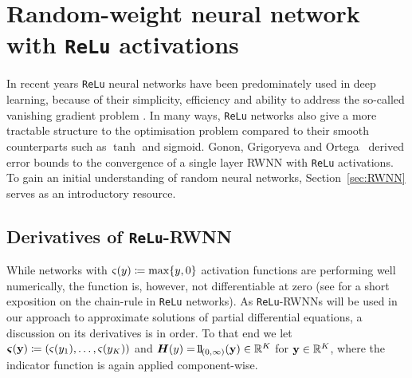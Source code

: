 \section{Random-weight neural network with \texttt{ReLu} activations}\label{sec:ReLu-RWNN}

In recent years \texttt{ReLu} neural networks have been predominately used in deep learning, because of their simplicity, efficiency and ability to address the so-called vanishing gradient problem \cite{LeCun2012EfficientBackProp}. In many ways, \texttt{ReLu} networks also give a more tractable structure to the optimisation problem compared to their smooth counterparts such as $\tanh$ and sigmoid. 
Gonon, Grigoryeva and Ortega~\cite{Gonon2023ApproximationSystems} derived error bounds to the convergence of a single layer RWNN with \texttt{ReLu} activations. 
To gain an initial understanding of random neural networks, Section~\ref{sec:RWNN} serves as an introductory resource.

\subsection{Derivatives of \texttt{ReLu}-RWNN}
\label{sec:RWNNderivatives}
While networks with ${\varsigma(y)\coloneqq \max\{y,0\}}$ activation functions are performing well numerically, the function is, however, not differentiable at zero (see \cite{Berner2019TowardsEstimates} for a short exposition on the chain-rule in \texttt{ReLu} networks). As \texttt{ReLu}-RWNNs will be used in our approach to approximate solutions of partial differential equations, a discussion on its derivatives is in order. 
To that end we let $\operatorname{\boldsymbol\varsigma}(\mathbf{y})\coloneqq(\varsigma(y_1),\dots,\varsigma(y_K))$ and $\Hb(y)=\ind_{(0,\infty)}(\yybf)\in\RR^K$ for $\mathbf{y}\in\mathbb{R}^K$, where the indicator function is again applied component-wise. 


